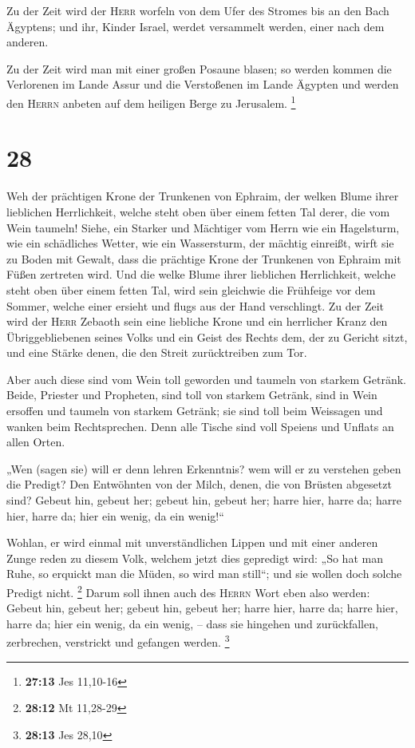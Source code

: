  Zu der Zeit wird der \textsc{Herr} worfeln von dem Ufer
des Stromes bis an den Bach Ägyptens; und ihr, Kinder Israel, werdet
versammelt werden, einer nach dem anderen.

 Zu der Zeit wird man mit einer großen Posaune blasen; so
werden kommen die Verlorenen im Lande Assur und die Verstoßenen im Lande
Ägypten und werden den \textsc{Herrn} anbeten auf dem heiligen Berge zu
Jerusalem. \footnote{\textbf{27:13} Jes 11,10-16}

\hypertarget{section-11}{%
\section{28}\label{section-11}}

 Weh der prächtigen Krone der Trunkenen von Ephraim, der
welken Blume ihrer lieblichen Herrlichkeit, welche steht oben über einem
fetten Tal derer, die vom Wein taumeln!  Siehe, ein
Starker und Mächtiger vom Herrn wie ein Hagelsturm, wie ein schädliches
Wetter, wie ein Wassersturm, der mächtig einreißt, wirft sie zu Boden
mit Gewalt,  dass die prächtige Krone der Trunkenen von
Ephraim mit Füßen zertreten wird.  Und die welke Blume
ihrer lieblichen Herrlichkeit, welche steht oben über einem fetten Tal,
wird sein gleichwie die Frühfeige vor dem Sommer, welche einer ersieht
und flugs aus der Hand verschlingt.  Zu der Zeit wird der
\textsc{Herr} Zebaoth sein eine liebliche Krone und ein herrlicher Kranz
den Übriggebliebenen seines Volks  und ein Geist des
Rechts dem, der zu Gericht sitzt, und eine Stärke denen, die den Streit
zurücktreiben zum Tor.

 Aber auch diese sind vom Wein toll geworden und taumeln
von starkem Getränk. Beide, Priester und Propheten, sind toll von
starkem Getränk, sind in Wein ersoffen und taumeln von starkem Getränk;
sie sind toll beim Weissagen und wanken beim Rechtsprechen.
 Denn alle Tische sind voll Speiens und Unflats an allen
Orten.

 „Wen (sagen sie) will er denn lehren Erkenntnis? wem will
er zu verstehen geben die Predigt? Den Entwöhnten von der Milch, denen,
die von Brüsten abgesetzt sind?  Gebeut hin, gebeut her;
gebeut hin, gebeut her; harre hier, harre da; harre hier, harre da; hier
ein wenig, da ein wenig!{}``

 Wohlan, er wird einmal mit unverständlichen Lippen und
mit einer anderen Zunge reden zu diesem Volk, welchem jetzt dies
gepredigt wird:  „So hat man Ruhe, so erquickt man die
Müden, so wird man still``; und sie wollen doch solche Predigt nicht.
\footnote{\textbf{28:12} Mt 11,28-29}  Darum soll ihnen
auch des \textsc{Herrn} Wort eben also werden: Gebeut hin, gebeut her;
gebeut hin, gebeut her; harre hier, harre da; harre hier, harre da; hier
ein wenig, da ein wenig, -- dass sie hingehen und zurückfallen,
zerbrechen, verstrickt und gefangen werden. \footnote{\textbf{28:13} Jes
  28,10}

